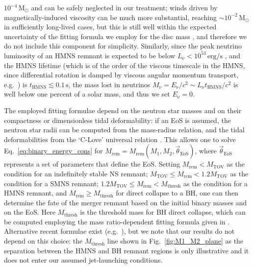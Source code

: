 \documentclass[]{aa}
\newcommand{\resp}[1]{#1}
\begin{document}
$10^{-4}\,\mathrm{M_\odot}$ and can be safely neglected in our treatment; winds driven by magnetically-induced viscosity can be much more substantial, reaching $\sim 10^{-2}\,\mathrm{M_\odot}$ \citep{Ciolfi2020_winds} in sufficiently long-lived cases, but this is still well within the expected uncertainty of the fitting formula we employ for the disc mass \citep[][]{Kruger2020}, and therefore we do not include this component for simplicity. Similarly, since the peak neutrino luminosity of an HMNS remnant is expected to be below $L_\mathrm{\nu}<10^{53}\,\mathrm{erg/s}$ \citep{Dessart2009,Perego2014}, and the HMNS lifetime (\resp{which is of the order of} the \resp{viscous} timescale \resp{in the HMNS, since} differential rotation is damped \resp{by viscous angular momentum transport},  e.g.\ \citealt{Kiuchi2018}) is $t_\mathrm{HMNS}\lesssim 0.1\,\mathrm{s}$, the mass lost in neutrinos $M_\mathrm{\nu}=E_\mathrm{\nu}/c^2\sim L_\mathrm{\nu}t_\mathrm{HMNS}/c^2$ is well below one percent of a solar mass, and thus we set $E_\mathrm{\nu}=0$. 

The employed fitting formulae depend on the neutron star masses and on their compactness or dimensionless tidal deformability: if an EoS is assumed, the neutron star radii can be computed from the mass-radius relation, and the tidal deformabilities from the `C-Love' universal relation \citep{Yagi2017}. This allows one to solve Eq.~\ref{eq:binary_energy_cons} for $M_\mathrm{rem}=M_\mathrm{rem}(M_1,M_2,\vec\theta_\mathrm{EoS})$, where $\vec\theta_\mathrm{EoS}$ represents a set of parameters that define the EoS. Setting $M_\mathrm{rem}<M_\mathrm{TOV}$ as the condition for an indefinitely stable NS remnant; $M_\mathrm{TOV}\leq M_\mathrm{rem}<1.2 M_\mathrm{TOV}$ as the condition for a SMNS remnant; $1.2 M_\mathrm{TOV}\leq M_\mathrm{rem}< M_\mathrm{thresh}$ as the condition for a HMNS remnant, and $M_\mathrm{rem}\geq M_\mathrm{thresh}$ for direct collapse to a BH, one can then determine the fate of the merger remnant based on the initial binary masses and on the EoS. Here $M_\mathrm{thresh}$ is the threshold mass for BH direct collapse, which can be computed employing the mass ratio-dependent fitting formula given in \citealt{Bauswein2021}. Alternative recent formulae exist (e.g.~\citealt{Tootle2021,Kashyap2021,Kolsch2021}), but we note that our results do not depend on this choice: the $M_\mathrm{thresh}$ line shown in Fig.~\ref{fig:M1_M2_plane} as the separation between the HMNS and BH remnant regions is only illustrative and it does not enter our assumed jet-launching conditions.
\end{document}
